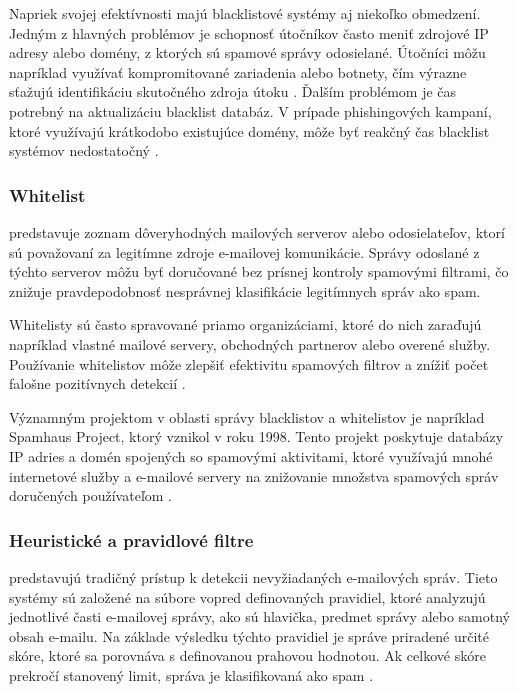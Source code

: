 \documentclass[conference]{IEEEtran}
\begin{document}
Napriek svojej efektívnosti majú blacklistové systémy aj
niekoľko obmedzení. Jedným z hlavných problémov je
schopnosť útočníkov často meniť zdrojové IP adresy alebo
domény, z ktorých sú spamové správy odosielané.
Útočníci môžu napríklad využívať kompromitované
zariadenia alebo botnety, čím výrazne sťažujú identifikáciu
skutočného zdroja útoku \cite{karim2019spam}. Ďalším
problémom je čas potrebný na aktualizáciu blacklist
databáz. V prípade phishingových kampaní, ktoré využívajú
krátkodobo existujúce domény, môže byť reakčný čas
blacklist systémov nedostatočný \cite{karim2019spam}.

\subsubsection*{Whitelist}

predstavuje zoznam dôveryhodných mailových
serverov alebo odosielateľov, ktorí sú považovaní za
legitímne zdroje e-mailovej komunikácie. Správy
odoslané z týchto serverov môžu byť doručované bez
prísnej kontroly spamovými filtrami, čo znižuje
pravdepodobnosť nesprávnej klasifikácie legitímnych
správ ako spam.

Whitelisty sú často spravované priamo organizáciami,
ktoré do nich zaraďujú napríklad vlastné mailové
servery, obchodných partnerov alebo overené služby.
Používanie whitelistov môže zlepšiť efektivitu
spamových filtrov a znížiť počet falošne pozitívnych
detekcií \cite{karim2019spam}.

Významným projektom v oblasti správy blacklistov
a whitelistov je napríklad Spamhaus Project, ktorý
vznikol v roku 1998. Tento projekt poskytuje databázy
IP adries a domén spojených so spamovými aktivitami,
ktoré využívajú mnohé internetové služby a e-mailové
servery na znižovanie množstva spamových správ
doručených používateľom \cite{karim2019spam}.

\subsubsection*{Heuristické a pravidlové filtre}

 predstavujú tradičný prístup k detekcii
nevyžiadaných e-mailových správ. Tieto systémy sú založené
na súbore vopred definovaných pravidiel, ktoré analyzujú
jednotlivé časti e-mailovej správy, ako sú hlavička, predmet
správy alebo samotný obsah e-mailu. Na základe výsledku
týchto pravidiel je správe priradené určité skóre, ktoré sa
porovnáva s definovanou prahovou hodnotou. Ak celkové
skóre prekročí stanovený limit, správa je klasifikovaná ako
spam \cite{karim2019spam}.
\end{document}

